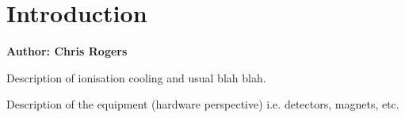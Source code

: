 \section{Introduction}
\label{Sect:Intro}

\bf{Author: Chris Rogers}

Description of ionisation cooling and usual blah blah.

Description of the equipment (hardware perspective) i.e. detectors, magnets, etc.


